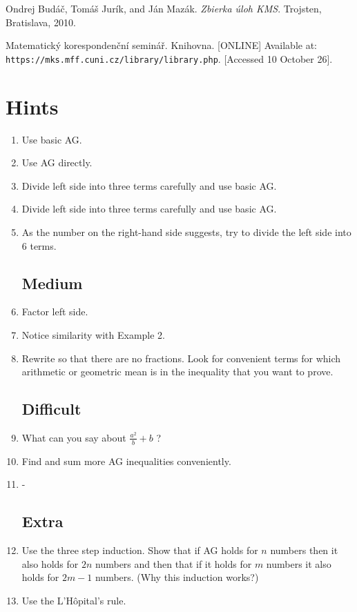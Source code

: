 \documentclass[11pt,a5paper]{article}
\begin{document}
\begin{thebibliography}{9}
 Ondrej Budáč, Tomáš Jurík, and Ján Mazák. 
	\emph{Zbierka úloh KMS}. Trojsten, Bratislava, 2010.
	
 Matematický korespondenční seminář. Knihovna. [ONLINE] Available at: \texttt{https://mks.mff.cuni.cz/library/library.php}. [Accessed 10 October 26].
\end{thebibliography}

\section{Hints}
\begin{enumerate}
	\subsection*{Easy}
	\item{Use basic AG.}
	\item{Use AG directly.}
	\item{Divide left side into three terms carefully and use basic AG.}
	\item{Divide left side into three terms carefully and use basic AG.}
	\item{As the number on the right-hand side suggests, try to divide the left side into 6 terms.}
	\subsection*{Medium}
	\item{Factor left side.}
	\item{Notice similarity with Example 2.}
	\item{Rewrite so that there are no fractions. Look for convenient terms for which arithmetic or geometric mean is in the inequality that you want to prove.}
	
	\subsection*{Difficult}
	\item{What can you say about $\frac{a^2}{b} + b$ ?}
	\item{Find and sum more AG inequalities conveniently.}
	\item{ - }
	
	\subsection*{Extra}	
	\item{Use the three step induction. Show that if AG holds for $n$ 
	numbers then it also holds for $2n$ numbers and then that if it 
	holds for $m$ numbers it also holds for $2m-1$ numbers. (Why this 
	induction works?)}
	
	\item{Use the L'Hôpital's rule.}
\end{enumerate}
\end{document}
